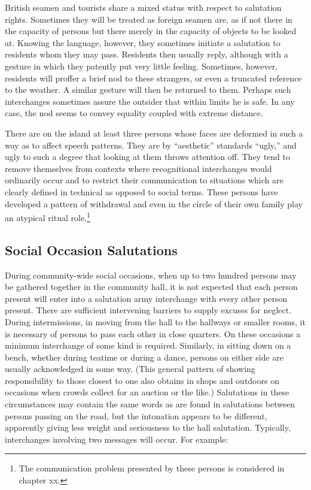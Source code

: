 \documentclass[openany,nobib]{tufte-book}
\begin{document}
British seamen and tourists share a mixed status with respect to
salutation rights. Sometimes they will be treated as foreign seamen are,
as if not there in the capacity of persons but there merely in the
capacity of objects to be looked at. Knowing the language, however, they
sometimes initiate a salutation to residents whom they may pass.
Residents then usually reply, although with a gesture in which they
patently put very little feeling. Sometimes, however, residents will
proffer a brief nod to these strangers, or even a truncated reference to
the weather. A similar gesture will then be returned to them. Perhaps
such interchanges sometimes assure the outsider that within limits he is
safe. In any case, the nod seems to convey equality coupled with extreme
distance.

There are on the island at least three persons whose faces are deformed
in such a way as to affect speech patterns. They are by ``aesthetic''
standards ``ugly,'' and ugly to such a degree that looking at them
throws attention off. They tend to remove themselves from contexts where
recognitional interchanges would ordinarily occur and to restrict their
communication to situations which are clearly defined in technical as
opposed to social terms. These persons have developed a pattern of
withdrawal and even in the circle of their own family play an atypical
ritual role.\footnote{The communication problem presented by these
  persons is considered in chapter xx.}

\hypertarget{social-occasion-salutations}{%
\subsection{Social Occasion
Salutations}\label{social-occasion-salutations}}

During community-wide social occasions, when up to two hundred persons
may be gathered together in the community hall, it is not expected that
each person present will enter into a salutation army interchange with
every other person present. There are sufficient intervening barriers to
supply excuses for neglect. During intermissions, in moving from the
hall to the hallways or smaller rooms, it is necessary of persons to
pass each other in close quarters. On these occasions a minimum
interchange of some kind is required. Similarly, in sitting down on a
bench, whether during teatime or during a dance, persons on either side
are usually acknowledged in some way. (This general pattern of showing
responsibility to those closest to one also obtains in shops and
outdoors on occasions when crowds collect for an auction or the like.)
Salutations in these circumstances may contain the same words as are
found in salutations between persons passing on the road, but the
intonation appears to be different, apparently giving less weight and
seriousness to the hall salutation. Typically, interchanges involving
two messages will occur. For example:
\end{document}
